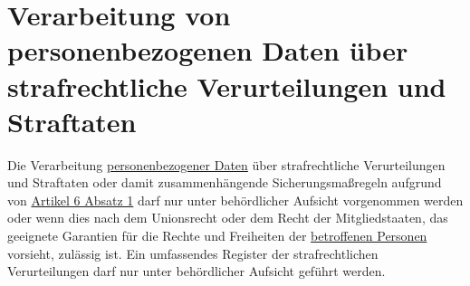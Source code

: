 \chapter{Verarbeitung von personenbezogenen Daten über strafrechtliche Verurteilungen und Straftaten}
\label{ch:10}


Die Verarbeitung \hyperref[itm:04-1]{personenbezogener Daten} über strafrechtliche Verurteilungen und Straftaten oder damit zusammenhängende
Sicherungsmaßregeln aufgrund von \hyperref[itm:06-1]{Artikel 6 Absatz 1} darf nur unter behördlicher Aufsicht
vorgenommen werden oder wenn dies nach dem Unionsrecht oder dem Recht der Mitgliedstaaten, das geeignete Garantien für
die Rechte und Freiheiten der \hyperref[itm:04-1]{betroffenen Personen} vorsieht, zulässig ist. Ein umfassendes Register der
strafrechtlichen Verurteilungen darf nur unter behördlicher Aufsicht geführt werden.


